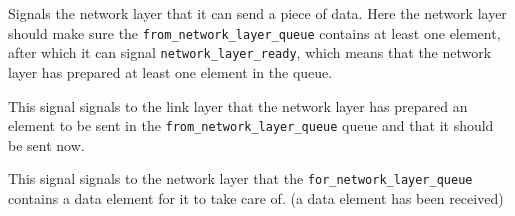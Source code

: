 \begin{description}[leftmargin=1em, style=nextline]
\item [\texttt{network\_layer\_allowed\_to\_send}] Signals the network layer that it can send a piece of data.
Here the network layer should make sure the \texttt{from\_network\_layer\_queue}
contains at least one element, after which it can signal \texttt{network\_layer\_ready},
which means that the network layer has prepared at least one element in the queue.

\item [\texttt{network\_layer\_ready}] This signal signals to the link layer that the network layer has prepared an element to be sent in the
  \texttt{from\_network\_layer\_queue} queue and that it should be sent now.

\item [\texttt{data\_for\_network\_layer}]
This signal signals to the network layer that the
\texttt{for\_network\_layer\_queue} contains a data element for it to take care of. (a data element has been received)
\end{description}

\hfill \break
